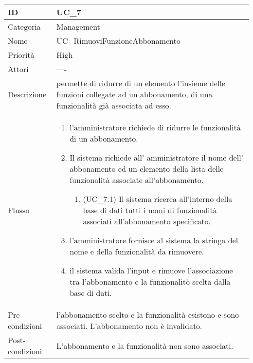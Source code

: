 \begin{center}
\begin{tabular}{ |p{2cm}|p{13cm}|  }
\hline
ID & UC\_7 \\\hline
Categoria & Management\\\hline
Nome & UC\_RimuoviFunzioneAbbonamento\\\hline
Priorità & High \\\hline
Attori &  ---- \\\hline
Descrizione & permette di ridurre di un elemento l'insieme delle funzioni collegate ad un abbonamento, di una funzionalità già associata ad esso.\\\hline
Flusso &  	\begin{enumerate}
			\item l'amministratore richiede di ridurre le funzionalità di  un abbonamento.
			\item Il sistema richiede all' amministratore il nome dell' abbonamento ed un elemento della lista delle funzionalità associate all'abbonamento.
			\begin{enumerate}
				\item (UC\_7.1) Il sistema ricerca all'interno della base di dati tutti i nomi di funzionalità associati all'abbonamento specificato.
			\end{enumerate}
			\item l'amministratore fornisce al sistema la stringa del nome e della funzionalità da rimuovere.
			\item il sistema valida l'input e rimuove l'associazione tra l'abbonamento e la funzionalitò scelta dalla base di dati.
		\end{enumerate}\\\hline
Pre-condizioni &  l'abbonamento scelto e la funzionalità esistono e sono associati.\newline 
			L'abbonamento non è invalidato.\\\hline
Post-condizioni &  L'abbonamento e la funzionalità non sono associati.\\\hline
\end{tabular}
\label{table_use_case:7}\newline


\end{center}
